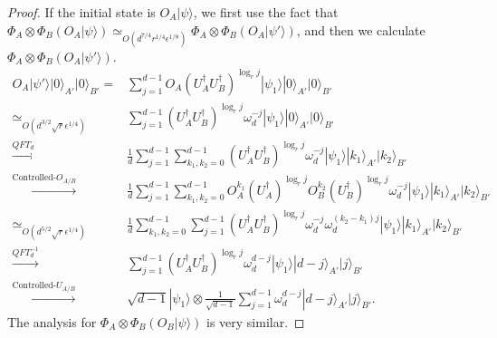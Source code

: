 \documentclass[11pt,letterpaper]{article}
\newcommand{\ket}[1]{|#1\rangle}
\newcommand{\x}{\otimes}
\newcommand{\ct}{^{\dagger}}
\newcommand{\1}{\mathbb{1}}
\newcommand{\ep}{\epsilon}
\newcommand{\sr}{\sqrt{r}}
\newcommand{\appd}[1]{\simeq_{#1}}
\theoremstyle{definition}
\begin{document}
\begin{proof}
If the initial state is $O_A\ket{\psi}$, we first use the fact that 
$ \Phi_A \x \Phi_B (O_A\ket{\psi}) \appd{O(d^{7/4} r^{1/4} \ep^{1/8})}  \Phi_A \x \Phi_B (O_A\ket{\psi'})$, 
and then we calculate $\Phi_A \x \Phi_B (O_A\ket{\psi'})$.
\begin{align}
	O_A \ket{\psi'} \ket{0}_{A'}\ket{0}_{B'} =&  
		\sum_{j=1}^{d-1} O_A(U_A\ct U_B\ct)^{\log_r j}\ket{\psi_1}\ket{0}_{A'}\ket{0}_{B'}\\
		\appd{O(d^{3/2} \sr \ep^{1/4})}&\sum_{j=1}^{d-1}(U_A\ct U_B\ct)^{\log_r j} \omega_d^{-j} \ket{\psi_1} \ket{0}_{A'}\ket{0}_{B'}\\
		\xrightarrow[]{QFT_d} &\frac{1}{d}\sum_{j=1}^{d-1} \sum_{k_1,k_2 = 0}^{d-1}(U_A\ct U_B\ct)^{\log_r j} \omega_d^{-j} 
		\ket{\psi_1}\ket{k_1}_{A'}\ket{k_2}_{B'}\\
		\xrightarrow[]{\text{Controlled-}O_{A/B}}&\frac{1}{d}\sum_{j=1}^{d-1}\sum_{k_1,k_2 = 0}^{d-1} 
		 O_A^{k_1}(U_A\ct)^{\log_r j} O_B^{k_2}(U_B\ct)^{\log_r j} \omega_d^{-j} \ket{\psi_1} \ket{k_1}_{A'}\ket{k_2}_{B'}\\
		\appd{O(d^{5/2} \sr \ep^{1/4})}& \frac{1}{d}\sum_{k_1,k_2 = 0}^{d-1} \sum_{j=1}^{d-1} (U_A\ct U_B\ct)^{\log_r j}
		\omega_d^{-j}\omega_d^{(k_2-k_1)j}\ket{\psi_1}
		 \ket{k_1}_{A'}\ket{k_2}_{B'}\\
		\xrightarrow[]{QFT_d^{-1}}& \sum_{j=1}^{d-1}  (U_A\ct U_B\ct)^{\log_r j}  
		\omega_d^{d-j}\ket{\psi_1} \ket{d-j}_{A'}\ket{j}_{B'}\\
		\xrightarrow[]{\text{Controlled-}U_{A/B}}&   \sqrt{d-1} \ket{\psi_1} \x  
		\frac{1}{\sqrt{d-1}}\sum_{j=1}^{d-1} \omega_d^{d-j}\ket{d-j}_{A'}\ket{j}_{B'}.
\end{align}
The analysis for $\Phi_A\x\Phi_B(O_B \ket{\psi})$ is very similar.


\end{proof}
\end{document}
